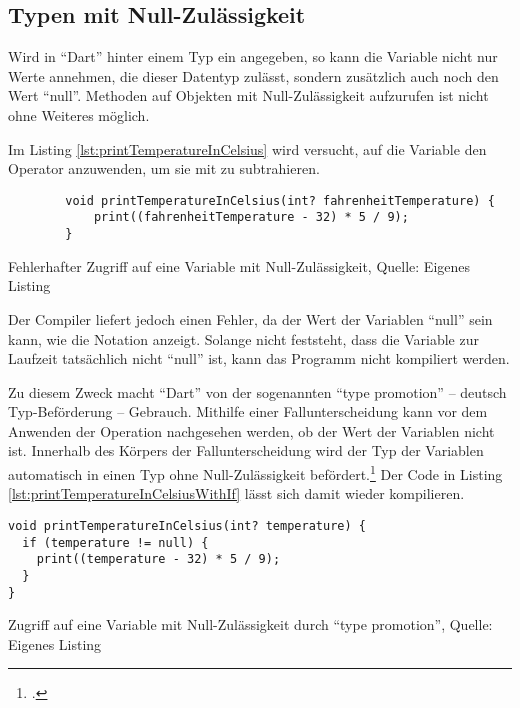 \subsection{Typen mit Null-Zulässigkeit}
\label{sec:TypenMitNullZulaessigkeit}

Wird in \enquote{Dart} hinter einem Typ ein  angegeben, 
so kann die Variable nicht nur  Werte annehmen, die dieser Datentyp zulässt,
sondern zusätzlich auch noch den Wert \enquote{null}.
Methoden auf Objekten mit Null-Zulässigkeit aufzurufen ist nicht ohne Weiteres möglich.

Im Listing \ref{lst:printTemperatureInCelsius}
wird versucht, auf die Variable  den Operator \IC{-} anzuwenden, um sie mit  zu subtrahieren.


\ifIncludeFigures
  \begin{listing}[ht]
    \begin{verbatim}
        void printTemperatureInCelsius(int? fahrenheitTemperature) {
            print((fahrenheitTemperature - 32) * 5 / 9);
        }
\end{verbatim}
    \caption[Fehlerhafter Zugriff auf eine Variable mit Null-Zulässigkeit]{Fehlerhafter Zugriff auf eine Variable mit Null-Zulässigkeit, Quelle: Eigenes Listing}
    \label{lst:printTemperatureInCelsius}
  \end{listing}
\fi

Der Compiler liefert jedoch einen Fehler, da der Wert der Variablen \enquote{null} sein kann, wie die Notation  anzeigt.
Solange nicht feststeht, dass die Variable zur Laufzeit tatsächlich nicht \enquote{null} ist, kann das Programm nicht kompiliert werden.


Zu diesem Zweck macht \enquote{Dart} von der sogenannten \enquote{type promotion} -- deutsch Typ-Beförde\-rung -- Gebrauch.
Mithilfe einer Fallunterscheidung kann vor dem Anwenden der Operation nachgesehen werden, ob der Wert der Variablen nicht  ist.
Innerhalb des Körpers der Fallunterscheidung wird der Typ der Variablen automatisch in einen Typ ohne Null-Zulässigkeit befördert.\footcite[Vgl.][]{TypePromotionOnNullChecks}
Der Code in Listing \ref{lst:printTemperatureInCelsiusWithIf} lässt sich damit wieder kompilieren.

\ifIncludeFigures
  \begin{listing}[ht]
    \begin{verbatim}
void printTemperatureInCelsius(int? temperature) {
  if (temperature != null) {
    print((temperature - 32) * 5 / 9);
  }
}
\end{verbatim}
    \caption[Zugriff auf eine Variable mit Null-Zulässigkeit durch \enquote{type promotion}]{Zugriff auf eine Variable mit Null-Zulässigkeit durch \enquote{type promotion}, Quelle: Eigenes Listing}
    \label{lst:printTemperatureInCelsiusWithIf}
  \end{listing}
\fi

